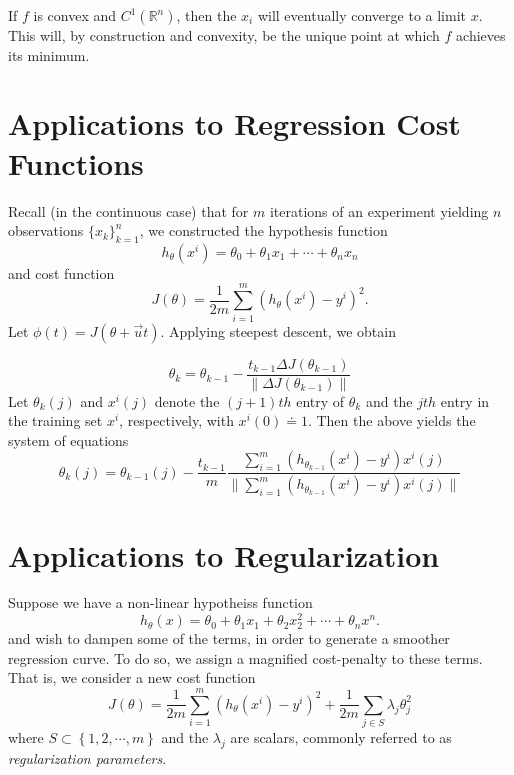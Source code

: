 If $f$ is convex and $C^{1}(\mathbb{R}^{n})$, then the $x_{i}$ will eventually converge
to a limit $x$. This will, by construction and convexity, be the unique point at
which $f$ achieves its minimum.

\section{Applications to Regression Cost Functions}

Recall (in the continuous case) that for $m$ iterations of an experiment
yielding $n$ observations $\{x_{k} \}_{k=1}^{n}$, we constructed the hypothesis function
\begin{equation*}
	h_{\theta}(x^{i}) = \theta_{0} + \theta_{1}x_{1} + \cdots +
	\theta_{n} x_{n}
\end{equation*}
and cost function
\begin{equation*}
	J(\theta) = \frac{1}{2m} \sum_{i=1}^{m} \left (h_{\theta}(x^{i}) - y^{i}
	\right )^{2}.
\end{equation*}
Let $\phi(t) = J(\theta + \vec{u} t)$. Applying steepest descent, we obtain 

\begin{equation*}
	\theta_{k} = \theta_{k-1} - \frac{t_{k-1} \Delta J(\theta_{k-1})}{\| \Delta
	J(\theta_{k-1}) \|}
\end{equation*}
Let $\theta_{k}(j)$ and $x^{i}(j)$ denote the $(j+1)th$ entry of $\theta_{k}$
and the $jth$ entry in the training set $x^{i}$, respectively, with
$x^{i}(0) \doteq 1$. Then the above yields the system of equations
\begin{equation*}
	\theta_{k}(j) = \theta_{k-1}(j) - \frac{t_{k-1}}{m} \frac{\sum_{i=1}^{m}
	\left( h_{\theta_{k-1}}(x^{i}) - y^{i} \right) x^{i}(j)}{\|  \sum_{i=1}^{m}
	\left( h_{\theta_{k-1}}(x^{i}) - y^{i} \right) x^{i}(j) \|}
\end{equation*}

\section{Applications to Regularization}
Suppose we have a non-linear hypotheiss function
\begin{equation*}
	h_{\theta}(x) = \theta_{0} + \theta_{1} x_{1} + \theta_{2} x_{2}^{2} + \cdots
	+ \theta_{n} x^{n}.
\end{equation*}
and wish to dampen some of the terms, in order to generate a smoother regression
curve. To do so, we assign a magnified cost-penalty to these terms. That is, we
consider a new cost function
\begin{equation*}
	J(\theta) = \frac{1}{2m} \sum_{i=1}^{m} \left( h_{\theta}(x^{i}) -
	y^{i} \right)^{2} + \frac{1}{2m} \sum_{j \in S} \lambda_{j}
	\theta_{j}^{2}
\end{equation*}
where $S \subset \left\{ 1, 2, \cdots, m \right\}$ and the $\lambda_{j}$ are
scalars, commonly referred to as \emph{regularization parameters}.
